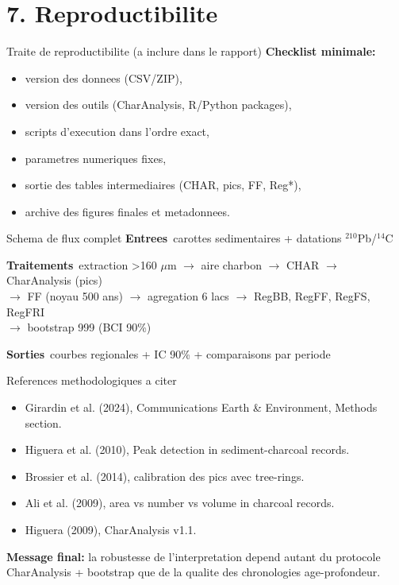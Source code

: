\documentclass[aspectratio=169,11pt]{beamer}
\begin{document}
\section{7. Reproductibilite}

\begin{frame}{Traite de reproductibilite (a inclure dans le rapport)}
\textbf{Checklist minimale:}
\begin{itemize}
  \item version des donnees (CSV/ZIP),
  \item version des outils (CharAnalysis, R/Python packages),
  \item scripts d'execution dans l'ordre exact,
  \item parametres numeriques fixes,
  \item sortie des tables intermediaires (CHAR, pics, FF, Reg*),
  \item archive des figures finales et metadonnees.
\end{itemize}
\end{frame}

\begin{frame}{Schema de flux complet}
\small
\textbf{Entrees}\
carottes sedimentaires + datations \(^{210}\)Pb/\(^{14}\)C

\vspace{0.15cm}
\textbf{Traitements}\
extraction >160 \(\mu\)m \(\rightarrow\) aire charbon \(\rightarrow\) CHAR \(\rightarrow\) CharAnalysis (pics) \\
\(\rightarrow\) FF (noyau 500 ans) \(\rightarrow\) agregation 6 lacs \(\rightarrow\) RegBB, RegFF, RegFS, RegFRI \\
\(\rightarrow\) bootstrap 999 (BCI 90\%)

\vspace{0.15cm}
\textbf{Sorties}\
courbes regionales + IC 90\% + comparaisons par periode
\end{frame}

\begin{frame}{References methodologiques a citer}
\footnotesize
\begin{itemize}
  \item Girardin et al. (2024), Communications Earth \& Environment, Methods section.
  \item Higuera et al. (2010), Peak detection in sediment-charcoal records.
  \item Brossier et al. (2014), calibration des pics avec tree-rings.
  \item Ali et al. (2009), area vs number vs volume in charcoal records.
  \item Higuera (2009), CharAnalysis v1.1.
\end{itemize}

\vspace{0.2cm}
\normalsize
\textbf{Message final:} la robustesse de l'interpretation depend autant du protocole CharAnalysis + bootstrap que de la qualite des chronologies age-profondeur.
\end{frame}
\end{document}
